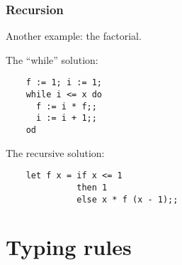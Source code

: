 \documentclass[12pt,red]{beamer}
\begin{document}
\begin{frame}[fragile]
  \frametitle{Recursion}

  Another example: the factorial.

  \vspace{0.1in}

  The ``while'' solution:
  \begin{verbatim}
    f := 1; i := 1;
    while i <= x do
      f := i * f;;
      i := i + 1;;
    od
  \end{verbatim}

  \vspace*{-0.2in}
  The recursive solution:
  \begin{beamerboxesrounded}[shadow=true]{}
    \begin{center}
    \begin{lstlisting}
    let f x = if x <= 1
              then 1
              else x * f (x - 1);;
    \end{lstlisting}
    \end{center}
  \end{beamerboxesrounded}
\end{frame}


\section{Typing rules}
\end{document}
